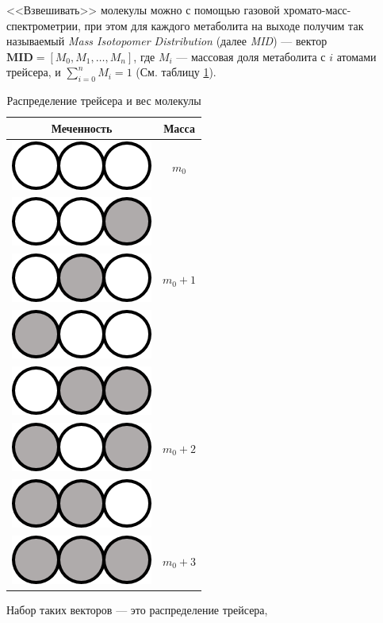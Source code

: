 \documentclass[14pt, a4paper]{extreport}
\begin{document}
<<Взвешивать>> молекулы можно с помощью газовой хромато-масс-\\спектрометрии, при этом для каждого метаболита на выходе получим так называемый \emph{Mass Isotopomer Distribution} (далее \emph{MID}) --- вектор $\boldsymbol{M\!I\!D} = [M_0, M_1, \ldots, M_n]$, где $M_i$ --- массовая доля метаболита с $i$ атомами трейсера, и $\sum_{i = 0}^{n} M_i= 1$ (См. таблицу \ref{MID}).

 \begin{table}
	\renewcommand{\arraystretch}{1.5}
	\begin{tabular}{c | c}
		\hline
		Меченность & Масса\\ 
		\hline
		\includegraphics{emus/000.png} & $m_0$\\
		\hline
		\includegraphics{emus/001.png} & \\
		\includegraphics{emus/010.png} & $m_0 + 1$\\
		\includegraphics{emus/100.png} & \\
		\hline
		\includegraphics{emus/011.png} & \\
		\includegraphics{emus/101.png} & $m_0 + 2$\\
		\includegraphics{emus/110.png} & \\
		\hline
		\includegraphics{emus/111.png} & $m_0 + 3$\\
	\end{tabular}
	\caption{Распределение трейсера и вес молекулы}
	\label{MID}
\end{table} Набор таких векторов --- это распределение трейсера, 
\end{document}
